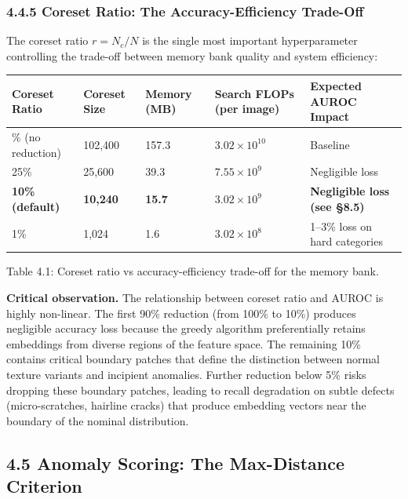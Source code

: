 \documentclass[12pt, a4paper, oneside]{report}
\begin{document}
\subsubsection{4.4.5 Coreset Ratio: The Accuracy-Efficiency Trade-Off}\label{coreset-ratio-the-accuracy-efficiency-trade-off}

The coreset ratio \(r = N_c / N\) is the single most important hyperparameter controlling the trade-off between memory bank quality and system efficiency:

{\def\LTcaptype{none} %
\begin{longtable}[]{@{}lllll@{}}
\toprule\noalign{}
Coreset Ratio & Coreset Size & Memory (MB) & Search FLOPs (per image) & Expected AUROC Impact \\
\midrule\noalign{}
\endhead
\bottomrule\noalign{}
\endlastfoot
100\% (no reduction) & 102,400 & 157.3 & \(3.02 \times 10^{10}\) & Baseline \\
25\% & 25,600 & 39.3 & \(7.55 \times 10^{9}\) & Negligible loss \\
\textbf{10\% (default)} & \textbf{10,240} & \textbf{15.7} & \textbf{\(3.02 \times 10^{9}\)} & \textbf{Negligible loss (see §8.5)} \\
1\% & 1,024 & 1.6 & \(3.02 \times 10^{8}\) & 1--3\% loss on hard categories \\
\end{longtable}
}

Table 4.1: Coreset ratio vs accuracy-efficiency trade-off for the memory bank.

\textbf{Critical observation.} The relationship between coreset ratio and AUROC is highly non-linear. The first 90\% reduction (from 100\% to 10\%) produces negligible accuracy loss because the greedy algorithm preferentially retains embeddings from diverse regions of the feature space. The remaining 10\% contains critical boundary patches that define the distinction between normal texture variants and incipient anomalies. Further reduction below 5\% risks dropping these boundary patches, leading to recall degradation on subtle defects (micro-scratches, hairline cracks) that produce embedding vectors near the boundary of the nominal distribution.

\bigskip\noindent\hrulefill\bigskip

\subsection{4.5 Anomaly Scoring: The Max-Distance Criterion}\label{anomaly-scoring-the-max-distance-criterion}
\end{document}

